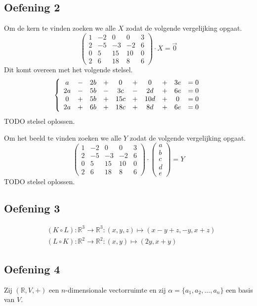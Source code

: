 \documentclass[lineaire_algebra_oplossingen.tex]{subfiles}
\begin{document}
\subsection{Oefening 2}
Om de kern te vinden zoeken we alle $X$ zodat de volgende vergelijking opgaat.
\[
\begin{pmatrix}
1 & -2 & 0 & 0 & 3\\
2 & -5 & -3 & -2 & 6\\
0 & 5 & 15 & 10 & 0\\
2 & 6 & 18 & 8 & 6
\end{pmatrix}
\cdot X
= \vec{0}
\]
Dit komt overeen met het volgende stelsel.
\[
\left\lbrace
\begin{array}{c c c c c c c c c c}
a &-& 2b &+& 0 &+& 0 &+& 3e &= 0\\
2a &-& 5b &-& 3c &-& 2d &+& 6e &= 0\\
0 &+& 5b &+& 15c &+& 10d &+& 0&= 0\\
2a &+& 6b &+& 18c &+& 8d &+& 6e &= 0
\end{array}
\right.
\]
TODO stelsel oplossen.

Om het beeld te vinden zoeken we alle $Y$ zodat de volgende vergelijking opgaat.
\[
\begin{pmatrix}
1 & -2 & 0 & 0 & 3\\
2 & -5 & -3 & -2 & 6\\
0 & 5 & 15 & 10 & 0\\
2 & 6 & 18 & 8 & 6
\end{pmatrix}
\cdot 
\begin{pmatrix}
a\\b\\c\\d\\e
\end{pmatrix}
= Y
\]
TODO stelsel oplossen.

\subsection{Oefening 3}
\begin{align*}
& (K\circ L): \mathbb{R}^3\rightarrow\mathbb{R}^3 :(x,y,z)\mapsto (x-y+z,-y,x+z) \\
& (L\circ K): \mathbb{R}^2\rightarrow\mathbb{R}^2 :(x,y)\mapsto (2y,x+y)
\end{align*}

\subsection{Oefening 4}
Zij $(\mathbb{R},V,+)$ een $n$-dimensionale vectorruimte en zij $\alpha = \{a_1,a_2,...,a_n\}$ een basis van $V$.
\end{document}
